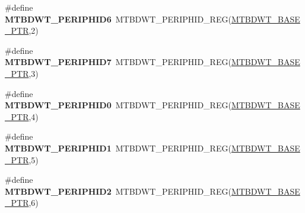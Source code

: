 \begin{DoxyCompactItemize}
\item 
\hypertarget{group___m_t_b_d_w_t___register___accessor___macros_gac164f79edd8679be62049881e3e01e68}{}\#define {\bfseries M\+T\+B\+D\+W\+T\+\_\+\+P\+E\+R\+I\+P\+H\+I\+D6}~M\+T\+B\+D\+W\+T\+\_\+\+P\+E\+R\+I\+P\+H\+I\+D\+\_\+\+R\+E\+G(\hyperlink{group___m_t_b_d_w_t___peripheral_ga97d048bfb5a11293a38c444b8347ff42}{M\+T\+B\+D\+W\+T\+\_\+\+B\+A\+S\+E\+\_\+\+P\+T\+R},2)\label{group___m_t_b_d_w_t___register___accessor___macros_gac164f79edd8679be62049881e3e01e68}

\item 
\hypertarget{group___m_t_b_d_w_t___register___accessor___macros_ga6f2e5a20f256ee541d4adc833f8d00ed}{}\#define {\bfseries M\+T\+B\+D\+W\+T\+\_\+\+P\+E\+R\+I\+P\+H\+I\+D7}~M\+T\+B\+D\+W\+T\+\_\+\+P\+E\+R\+I\+P\+H\+I\+D\+\_\+\+R\+E\+G(\hyperlink{group___m_t_b_d_w_t___peripheral_ga97d048bfb5a11293a38c444b8347ff42}{M\+T\+B\+D\+W\+T\+\_\+\+B\+A\+S\+E\+\_\+\+P\+T\+R},3)\label{group___m_t_b_d_w_t___register___accessor___macros_ga6f2e5a20f256ee541d4adc833f8d00ed}

\item 
\hypertarget{group___m_t_b_d_w_t___register___accessor___macros_ga07083686c100d0c9d3690d13bf1e6283}{}\#define {\bfseries M\+T\+B\+D\+W\+T\+\_\+\+P\+E\+R\+I\+P\+H\+I\+D0}~M\+T\+B\+D\+W\+T\+\_\+\+P\+E\+R\+I\+P\+H\+I\+D\+\_\+\+R\+E\+G(\hyperlink{group___m_t_b_d_w_t___peripheral_ga97d048bfb5a11293a38c444b8347ff42}{M\+T\+B\+D\+W\+T\+\_\+\+B\+A\+S\+E\+\_\+\+P\+T\+R},4)\label{group___m_t_b_d_w_t___register___accessor___macros_ga07083686c100d0c9d3690d13bf1e6283}

\item 
\hypertarget{group___m_t_b_d_w_t___register___accessor___macros_ga9e516a8106ad8dbb2c338a2727a6b309}{}\#define {\bfseries M\+T\+B\+D\+W\+T\+\_\+\+P\+E\+R\+I\+P\+H\+I\+D1}~M\+T\+B\+D\+W\+T\+\_\+\+P\+E\+R\+I\+P\+H\+I\+D\+\_\+\+R\+E\+G(\hyperlink{group___m_t_b_d_w_t___peripheral_ga97d048bfb5a11293a38c444b8347ff42}{M\+T\+B\+D\+W\+T\+\_\+\+B\+A\+S\+E\+\_\+\+P\+T\+R},5)\label{group___m_t_b_d_w_t___register___accessor___macros_ga9e516a8106ad8dbb2c338a2727a6b309}

\item 
\hypertarget{group___m_t_b_d_w_t___register___accessor___macros_ga823bbdb0a6008b9e4be7ff1646a8ec41}{}\#define {\bfseries M\+T\+B\+D\+W\+T\+\_\+\+P\+E\+R\+I\+P\+H\+I\+D2}~M\+T\+B\+D\+W\+T\+\_\+\+P\+E\+R\+I\+P\+H\+I\+D\+\_\+\+R\+E\+G(\hyperlink{group___m_t_b_d_w_t___peripheral_ga97d048bfb5a11293a38c444b8347ff42}{M\+T\+B\+D\+W\+T\+\_\+\+B\+A\+S\+E\+\_\+\+P\+T\+R},6)\label{group___m_t_b_d_w_t___register___accessor___macros_ga823bbdb0a6008b9e4be7ff1646a8ec41}


\end{DoxyCompactItemize}
